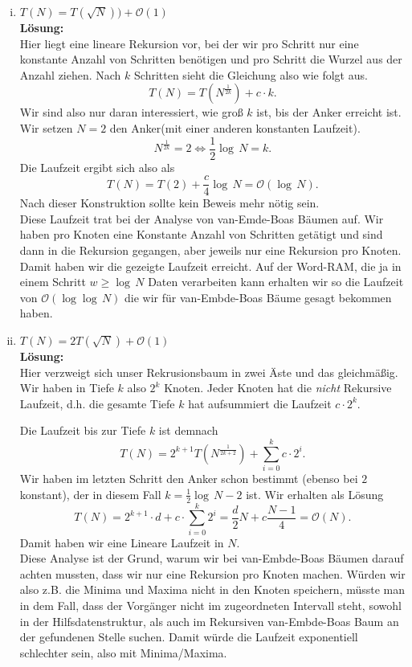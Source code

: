 \documentclass[11pt,a4paper,ngerman]{article}
\begin{document}
\begin{enumerate}[(i)]
	\item $T(N) = T(\sqrt{N})) + \mathcal{O}(1)$\\
	\noindent\textbf{Lösung:}\\
		Hier liegt eine lineare Rekursion vor, bei der wir pro Schritt nur eine konstante Anzahl von Schritten benötigen
		und pro Schritt die Wurzel aus der Anzahl ziehen. Nach $k$ Schritten sieht die Gleichung also wie folgt aus.
		$$
			T(N) = T(N^\frac{1}{2k}) + c \cdot k.
		$$
		Wir sind also nur daran interessiert, wie groß $k$ ist, bis der Anker erreicht ist. Wir setzen $N=2$ den Anker(mit
		einer anderen konstanten Laufzeit).
		$$
			N^\frac{1}{2k} = 2 \Leftrightarrow \frac{1}{2} \log \, N = k.
		$$
		Die Laufzeit ergibt sich also als
		$$
			T(N) = T(2) + \frac{c}{4} \log \, N = \mathcal{O}(\log \, N).
		$$
		Nach dieser Konstruktion sollte kein Beweis mehr nötig sein.\\

		Diese Laufzeit trat bei der Analyse von van-Emde-Boas Bäumen auf. Wir haben pro Knoten eine Konstante Anzahl von
		Schritten getätigt und sind dann in die Rekursion gegangen, aber jeweils nur eine Rekursion pro Knoten. Damit haben wir die
		gezeigte Laufzeit erreicht. Auf der Word-RAM, die ja in einem Schritt $w \geq \log \, N$ Daten verarbeiten kann erhalten wir so
		die Laufzeit von $\mathcal{O}(\log \log \, N)$ die wir für van-Embde-Boas Bäume gesagt bekommen haben.

	\item $T(N) = 2T(\sqrt{N}) + \mathcal{O}(1)$\\
	\noindent\textbf{Lösung:}\\
		Hier verzweigt sich unser Rekrusionsbaum in zwei Äste und das gleichmäßig.
		Wir haben in Tiefe $k$ also $2^k$ Knoten. Jeder Knoten hat die \emph{nicht} Rekursive Laufzeit,
		d.h. die gesamte Tiefe $k$ hat aufsummiert die Laufzeit $c \cdot 2^k$.

		Die Laufzeit bis zur Tiefe $k$ ist demnach
		$$
			T(N) = 2^{k+1}T(N^\frac{1}{2k+2}) + \sum_{i=0}^kc \cdot 2^i.
		$$
		Wir haben im letzten Schritt den Anker schon bestimmt (ebenso bei $2$ konstant), 
		der in diesem Fall $k = \frac{1}{2} \log \, N - 2$ ist.
		Wir erhalten als Lösung
		$$
			T(N) = 2^{k+1} \cdot d + c \cdot \sum_{i=0}^k 2^i = \frac{d}{2} N + c \frac{N - 1}{4} = \mathcal{O}(N).
		$$
		Damit haben wir eine Lineare Laufzeit in $N$.\\

		Diese Analyse ist der Grund, warum wir bei van-Embde-Boas Bäumen darauf achten mussten, dass wir nur eine
		Rekursion pro Knoten machen. Würden wir also z.B. die Minima und Maxima nicht in den Knoten speichern, müsste
		man in dem Fall, dass der Vorgänger nicht im zugeordneten Intervall steht, sowohl in der Hilfsdatenstruktur, als auch im
		Rekursiven van-Embde-Boas Baum an der gefundenen Stelle suchen. Damit würde die Laufzeit exponentiell schlechter
		sein, also mit Minima/Maxima.


\end{enumerate}
\end{document}

